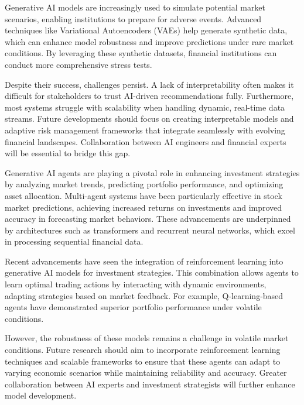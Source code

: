 \documentclass[a4paper,headinclude=on,footinclude=on,12pt,oneside]{scrbook}
\begin{document}
	Generative AI models are increasingly used to simulate potential market scenarios, enabling institutions to prepare for adverse events. Advanced techniques like Variational Autoencoders (VAEs) help generate synthetic data, which can enhance model robustness and improve predictions under rare market conditions. By leveraging these synthetic datasets, financial institutions can conduct more comprehensive stress tests.
	
	Despite their success, challenges persist. A lack of interpretability often makes it difficult for stakeholders to trust AI-driven recommendations fully. Furthermore, most systems struggle with scalability when handling dynamic, real-time data streams. Future developments should focus on creating interpretable models and adaptive risk management frameworks that integrate seamlessly with evolving financial landscapes. Collaboration between AI engineers and financial experts will be essential to bridge this gap.
	
	
	Generative AI agents are playing a pivotal role in enhancing investment strategies by analyzing market trends, predicting portfolio performance, and optimizing asset allocation. Multi-agent systems have been particularly effective in stock market predictions, achieving increased returns on investments and improved accuracy in forecasting market behaviors. These advancements are underpinned by architectures such as transformers and recurrent neural networks, which excel in processing sequential financial data.
	
	Recent advancements have seen the integration of reinforcement learning into generative AI models for investment strategies. This combination allows agents to learn optimal trading actions by interacting with dynamic environments, adapting strategies based on market feedback. For example, Q-learning-based agents have demonstrated superior portfolio performance under volatile conditions.
	
	However, the robustness of these models remains a challenge in volatile market conditions. Future research should aim to incorporate reinforcement learning techniques and scalable frameworks to ensure that these agents can adapt to varying economic scenarios while maintaining reliability and accuracy. Greater collaboration between AI experts and investment strategists will further enhance model development.
	
	
\end{document}
